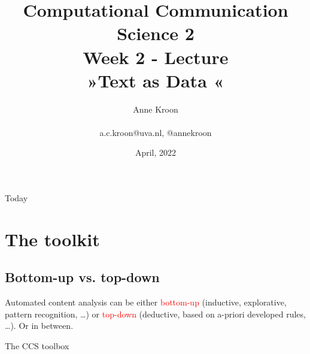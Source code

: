 \documentclass[compress]{beamer}
\title[Computational Communication Science 2]{\textbf{Computational Communication Science 2} \\Week 2 - Lecture\\ »Text as Data «}
\author[Anne Kroon]{Anne Kroon \\ ~ \\ \footnotesize{ a.c.kroon@uva.nl, @annekroon} \\}
\date{April, 2022}
\institute[Digital Society Minor, University of Amsterdam]{Digital Society Minor, University of Amsterdam}
\begin{document}
	
	\begin{frame}{}
		\titlepage
	\end{frame}
	
	\begin{frame}{Today}
		\begin{tiny}
		\tableofcontents
		\end{tiny}
	\end{frame}


\section{The toolkit}

\subsection{Bottom-up vs. top-down}

\begin{frame}[standout]
	Automated content analysis can be either \textcolor{red}{bottom-up} (inductive, explorative, pattern recognition, \ldots) or \textcolor{red}{top-down} (deductive, based on a-priori developed rules, \ldots). Or in between.
\end{frame}


\begin{frame}{The CCS toolbox}
	\\
	\cite{Boumans2016}
\end{frame}
\end{document}
